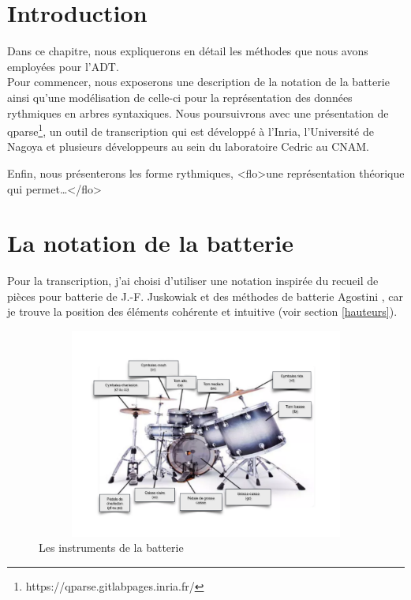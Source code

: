 \section*{Introduction}
Dans ce chapitre, nous expliquerons en détail les méthodes que nous avons
employées pour l’ADT.\\
Pour commencer, nous exposerons une description de la notation de la batterie
ainsi qu’une modélisation de celle-ci pour la représentation des données
rythmiques en arbres syntaxiques. Nous poursuivrons avec une présentation de
qparse\footnote{https://qparse.gitlabpages.inria.fr/}, un outil de
transcription qui est développé à l'Inria, l'Université de Nagoya et plusieurs
développeurs au sein du laboratoire Cedric au CNAM.

Enfin, nous présenterons les forme rythmiques, <flo>une représentation
théorique qui permet…</flo> 

\section{La notation de la batterie}
\label{notation_batterie}
Pour la transcription, j’ai choisi d’utiliser une notation inspirée du recueil
de pièces pour batterie de J.-F. Juskowiak \cite{jusko} et des méthodes de
batterie Agostini \cite{ago_meth_3}, car je trouve la position des éléments
cohérente et intuitive (voir section \ref{hauteurs}).\newpage

\begin{figure}[h]
\centering
\includegraphics[height=69mm, width=115mm]{
z_images/3_methodes/0_notation_de_la_batterie/batterie.png}
\caption{Les instruments de la batterie}
\label{instru_batt}
\end{figure}

